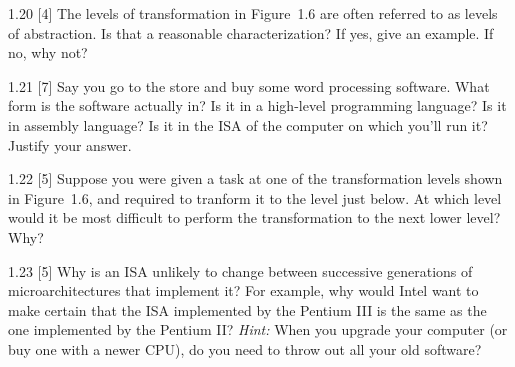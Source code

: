 \documentclass{patt}
\begin{document}
\begin{exercises}
\item[1.20]
[4] The levels of transformation in Figure~1.6 are often referred to
as levels of abstraction. Is that a reasonable characterization? If yes,
give an example. If no, why not?

\item[1.21]
[7] Say you go to the store and buy some word processing software.
What form is the software actually in?  Is it in a high-level
programming language? Is it in assembly language? Is it in
the ISA of the computer on which you'll run it? Justify
your answer.

\item[1.22] 
[5] Suppose you were given a task at one of the transformation
  levels shown in Figure~1.6, and required to tranform it to the level
  just below. At which level would it be most difficult to perform the
  transformation to the next lower level? Why?

\item[1.23] 
[5] Why is an ISA unlikely to change between successive
  generations of microarchitectures that implement it?  For example,
  why would Intel want to make certain that the ISA implemented by the
  Pentium III is the same as the one implemented by the Pentium II?  {\em
    Hint:} When you upgrade your computer (or buy one with a newer
  CPU), do you need to throw out all your old software?
\end{exercises}
\end{document}
